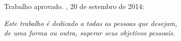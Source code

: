 \documentclass[
	12pt,               %
	openright,          %
	twoside,            %
	a4paper,            %
	english,            %
	brazil              %
	]{abntex2}
\begin{document}
%
% 
%
\begin{folhadeaprovacao}

  \begin{center}
	{\ABNTEXchapterfont\large\imprimirautor}

	\vspace*{\fill}\vspace*{\fill}
	\begin{center}
	  \ABNTEXchapterfont\bfseries\Large\imprimirtitulo
	\end{center}
	\vspace*{\fill}
	
	\hspace{.45\textwidth}
	\begin{minipage}{.5\textwidth}
		\imprimirpreambulo
	\end{minipage}%
	\vspace*{\fill}
   \end{center}
		
   Trabalho aprovado. \imprimirlocal, 20 de setembro de 2014:

	  
   \begin{center}
	\vspace*{0.5cm}
	{\large\imprimirlocal}
	\par
	{\large\imprimirdata}
	\vspace*{1cm}
  \end{center}
  
\end{folhadeaprovacao}

\begin{dedicatoria}
   \vspace*{\fill}
   \centering
   \noindent
   \textit{ Este trabalho é dedicado a todas as pessoas que desejam,\\ 
   de uma forma ou outra, superar seus objetivos pessoais.} \vspace*{\fill}
\end{dedicatoria}
\end{document}
